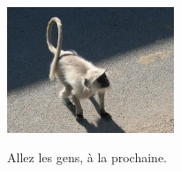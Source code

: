 \begin{multicols}{2}
\smallbreak
\hspace*{-0.65cm}
\includegraphics[width=5cm]{articles/La-vie-en-inde/singe.jpg}
\smallbreak

Allez les gens, à la prochaine.

\end{multicols}


